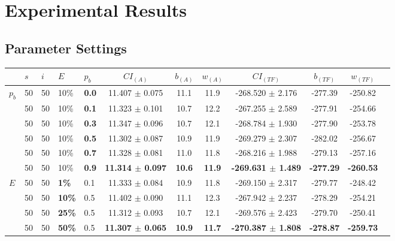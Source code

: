 \chapter{Experimental Results}
\label{appendixC}

\section{Parameter Settings}

\begin{sidewaystable}
    \begin{tabular}{|l|l|l|l|l||c|c|c|c|c|c|c|}
    \hline
    ~ & $s$ & $i$ & $E$ & $p_{b}$ & $CI_{(A)}$ & $b_{(A)}$ & $w_{(A)}$ & $CI_{(TF)}$ & $b_{(TF)}$ & $w_{(TF)}$\\
    \hline
    $p_{b}$ & 50 & 50 & 10\% & \textbf{0.0} & 11.407 $\pm$ 0.075 & 11.1 & 11.9 & -268.520 $\pm$ 2.176 & -277.39 & -250.82 \\
    ~ & 50 & 50 & 10\% & \textbf{0.1} & 11.323 $\pm$ 0.101 & 10.7 & 12.2 & -267.255 $\pm$ 2.589 & -277.91 & -254.66 \\
    ~ & 50 & 50 & 10\% & \textbf{0.3}& 11.347 $\pm$ 0.096 & 10.7 & 12.1 & -268.784 $\pm$ 1.930 & -277.90 & -253.78 \\
    ~ & 50 & 50 & 10\% & \textbf{0.5}& 11.302 $\pm$ 0.087 & 10.9 & 11.9 & -269.279 $\pm$ 2.307 & -282.02 & -256.67\\
    ~ & 50 & 50 & 10\% & \textbf{0.7}& 11.328 $\pm$ 0.081 & 11.0 & 11.8 & -268.216 $\pm$ 1.988 & -279.13 & -257.16\\
    ~ & 50 & 50 & 10\% & \textbf{0.9} & \textbf{11.314 $\pm$ 0.097} & \textbf{10.6} & \textbf{11.9} & \textbf{-269.631 $\pm$ 1.489} & \textbf{-277.29} & \textbf{-260.53}\\
    \hline
    $E$ & 50 & 50 & \textbf{1\%} & 0.1 & 11.333 $\pm$ 0.084 & 10.9 & 11.8 & -269.150 $\pm$ 2.317 & -279.77 & -248.42 \\
    ~ & 50 & 50 & \textbf{10\%} & 0.5 & 11.402 $\pm$ 0.090 & 11.1 & 12.3 & -267.942 $\pm$ 2.237 & -278.29 & -254.21 \\
    ~ & 50 & 50 & \textbf{25\%} & 0.5  & 11.312 $\pm$ 0.093 & 10.7 & 12.1 & -269.576 $\pm$ 2.423 & -279.70 & -250.41 \\
    ~ & 50 & 50 & \textbf{50\%} & 0.5 & \textbf{11.307 $\pm$ 0.065} & \textbf{10.9} & \textbf{11.7} & \textbf{-270.387 $\pm$ 1.808}  & \textbf{-278.87} & \textbf{-259.73} \\

\end{tabular}
\end{sidewaystable}
